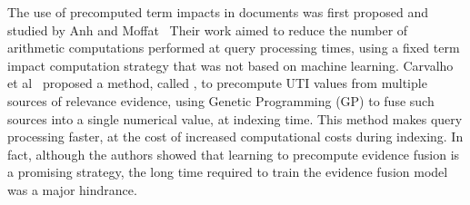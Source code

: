\documentclass[preprint,review,10pt,3p]{elsarticle}
\begin{document}

The use of precomputed term impacts in documents was first proposed and studied by Anh and Moffat~\cite{Anh:2002:ITE:564376.564380}
Their work aimed to reduce the number of arithmetic computations performed at query processing times, using a fixed term impact computation strategy that was not based on machine learning. Carvalho et al~\cite{costa2012lepref} proposed a method, called \lepref, to precompute UTI values from multiple sources of relevance evidence, using Genetic Programming (GP)
 to fuse such sources into a single numerical value, at indexing time. 
This method makes query processing faster, at the cost of increased computational costs during indexing. In fact, although the authors showed that learning to precompute evidence fusion is a promising strategy, the long time required to train the evidence fusion model was a major hindrance. 
\end{document}
